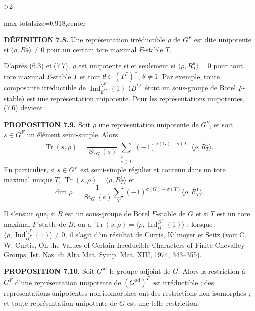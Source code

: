 \documentclass[9pt,twoside]{extarticle}
\newcommand{\EditionPage}[3]{%
  \ifnum#1>2\clearpage\fi
  \pdfbookmark[1]{Printed page #2}{fr-folio-#2}%
  \hypertarget{fr-physical-#1}{}%
  \noindent\begin{adjustbox}{max totalsize={\textwidth}{0.918\textheight},center}
  \begin{minipage}[t]{\textwidth}
  \fontsize{9.4}{11.1}\selectfont\justifying
  #3
  \end{minipage}
  \end{adjustbox}%
}
\begin{document}
\EditionPage{42}{143}{%
\noindent\textbf{DÉFINITION 7.8.} Une représentation irréductible \(\rho\) de \(G^F\) est dite unipotente si \(\langle\rho,R_T^1\rangle\ne0\) pour un certain tore maximal \(F\)-stable \(T\).\par

D'après (6.3) et (7.7), \(\rho\) est unipotente si et seulement si \(\langle\rho,R_T^\theta\rangle=0\) pour tout tore maximal \(F\)-stable \(T\) et tout \(\theta\in(T^F)^\vee\), \(\theta\ne1\). Par exemple, toute composante irréductible de \(\operatorname{Ind}_{B^{*F}}^{G^F}(1)\) (\(B^{*F}\) étant un sous-groupe de Borel \(F\)-stable) est une représentation unipotente. Pour les représentations unipotentes, (7.6) devient :\par

\noindent\textbf{PROPOSITION 7.9.} Soit \(\rho\) une représentation unipotente de \(G^F\), et soit \(s\in G^F\) un élément semi-simple. Alors \[
\operatorname{Tr}(s,\rho)=
\frac1{\operatorname{St}_G(s)}
\sum_{\substack{T\\s\in T}}
(-1)^{\sigma(G)-\sigma(T)}\langle\rho,R_T^1\rangle.
\] En particulier, si \(s\in G^F\) est semi-simple régulier et contenu dans un tore maximal unique \(T\), \(\operatorname{Tr}(s,\rho)=\langle\rho,R_T^1\rangle\) et \[
\dim\rho=
\frac1{\operatorname{St}_G(e)}
\sum_T(-1)^{\sigma(G)-\sigma(T)}\langle\rho,R_T^1\rangle.
\]\par

Il s'ensuit que, si \(B\) est un sous-groupe de Borel \(F\)-stable de \(G\) et si \(T\) est un tore maximal \(F\)-stable de \(B\), on a \(\operatorname{Tr}(s,\rho)=\langle\rho,\operatorname{Ind}_{B^F}^{G^F}(1)\rangle\) ; lorsque \(\langle\rho,\operatorname{Ind}_{B^F}^{G^F}(1)\rangle\ne0\), il s'agit d'un résultat de Curtis, Kilmoyer et Seitz (voir C. W. Curtis, On the Values of Certain Irreducible Characters of Finite Chevalley Groups, Ist. Naz. di Alta Mat. Symp. Mat. XIII, 1974, 343--355).\par

\noindent\textbf{PROPOSITION 7.10.} Soit \(G^{\mathrm{ad}}\) le groupe adjoint de \(G\). Alors la restriction à \(G^F\) d'une représentation unipotente de \((G^{\mathrm{ad}})^F\) est irréductible ; des représentations unipotentes non isomorphes ont des restrictions non isomorphes ; et toute représentation unipotente de \(G\) est une telle restriction.\par

}
\end{document}
